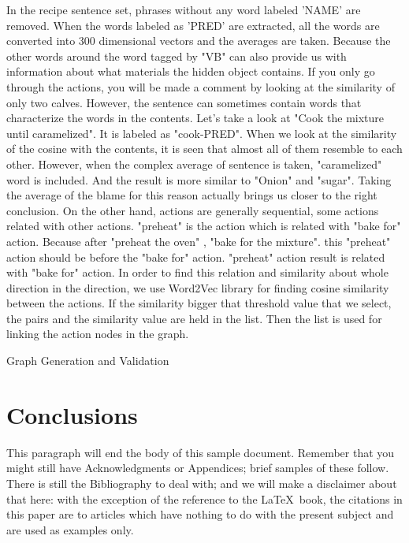 In the recipe sentence set, phrases without any word labeled 'NAME' are removed. When the words labeled as 'PRED' are extracted, all the words are converted into 300 dimensional vectors and the averages are taken. Because the other words around the word tagged by "VB" can also provide us with information about what materials the hidden object contains. If you only go through the actions, you will be made a comment by looking at the similarity of only two calves. However, the sentence can sometimes contain words that characterize the words in the contents. Let's take a look at "Cook the mixture until caramelized". It is labeled as "cook-PRED". When we look at the similarity of the cosine with the contents, it is seen that almost all of them resemble to each other. However, when the complex average of sentence is taken, "caramelized" word is included. And the result is more similar to "Onion" and "sugar". Taking the average of the blame for this reason actually brings us closer to the right conclusion. On the other hand, actions are generally sequential, some actions related with other actions. "preheat" is the action which is related with "bake for" action. Because after "preheat the oven" , "bake for the mixture". this "preheat" action should be before the "bake for" action. "preheat" action  result is related with "bake for" action. In order to find this relation and similarity about whole direction in the direction, we use Word2Vec library for finding cosine similarity between the actions. If the similarity bigger that threshold value that we select, the pairs and the similarity value are held  in the list. Then the list is used for linking the action nodes in the graph. 


\begin{algorithm}
\caption{Graph Generation and Validation}
\label{alg:generateGraph}
\end{algorithm}
        


\section{Conclusions}
This paragraph will end the body of this sample document.
Remember that you might still have Acknowledgments or
Appendices; brief samples of these
follow.  There is still the Bibliography to deal with; and
we will make a disclaimer about that here: with the exception
of the reference to the \LaTeX\ book, the citations in
this paper are to articles which have nothing to
do with the present subject and are used as
examples only.



